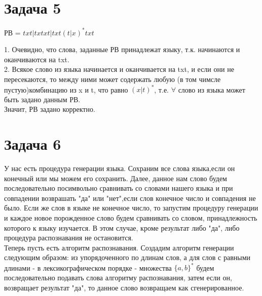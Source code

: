 \documentclass[a4paper,12pt]{article} %
\begin{document}
 \section*{Задача 5}
РВ = $txt|txtxt|txt(t|x)^*txt$ 

1. Очевидно, что слова, заданные РВ принадлежат языку, т.к. начинаются и оканчиваются на txt. \\
2. Всякое слово из языка начинается и оканчивается на txt, и если они не пересекаются, то между ними может содержать любую (в том чимсле пустую)комбинацию из x и t, что равно $(x|t)^*$, т.е. $\forall$ слово из языка может быть задано данным РВ.\\
Значит, РВ задано корректно.\\  
 
 \section*{Задача 6}
 
 У нас есть процедура генерации языка. Сохраним все слова языка,если он конечный или мы можем его сохранить. Далее, данное нам слово будем последовательно посимвольно сравнивать со словами нашего языка и при совпадении возврашать "да" или "нет",если слов конечное число и совпадения не было. Если же слов в языке не конечное число, то запустим процедуру генерации и каждое новое порожденное слово будем сравнивать со словом, принадлежность которого к языку изучается. В этом случае, кроме результат либо "да", либо процедура распознавания не остановится.\\ 
 
 Теперь пусть есть алгоритм распознавания. Создадим алгоритм генерации следующим образом: из упорядоченного по длинам слов, а для слов с равными длинами - в лексикографическом порядке - множества $ \{a, b\}^* $ будем последовательно подавать слова алгоритму распознавания, затем если он, возвращает результат "да", то данное слово возвращаем как сгенерированное.\\
\end{document}
